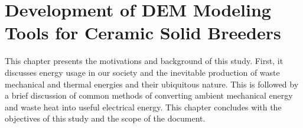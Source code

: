 \chapter{Development of DEM Modeling Tools for Ceramic Solid Breeders} \label{sec:modeling-dem}
This chapter presents the motivations and background of this study. First, it discusses energy usage in our society and the inevitable production of waste mechanical and thermal energies and their ubiquitous nature. This is followed by a brief discussion of common methods of converting ambient mechanical energy and waste heat into useful electrical energy. This chapter concludes with the objectives of this study and the scope of the document.










